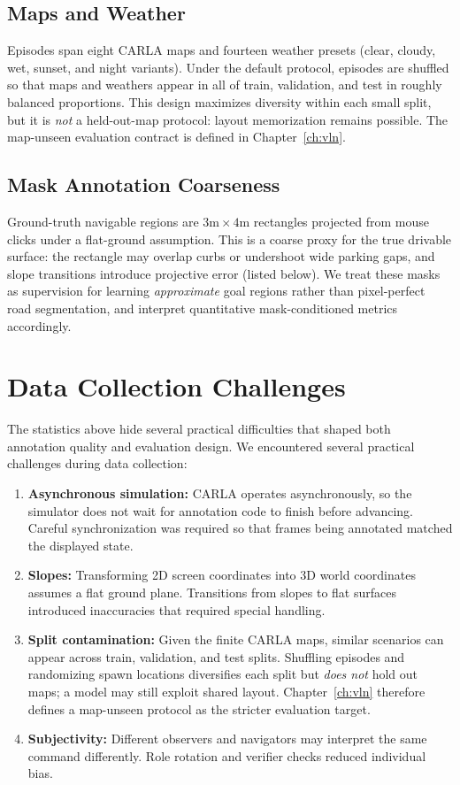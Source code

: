 \subsection{Maps and Weather}

Episodes span eight CARLA maps and fourteen weather presets (clear, cloudy, wet, sunset, and night variants). Under the default protocol, episodes are shuffled so that maps and weathers appear in all of train, validation, and test in roughly balanced proportions. This design maximizes diversity within each small split, but it is \emph{not} a held-out-map protocol: layout memorization remains possible. The map-unseen evaluation contract is defined in Chapter~\ref{ch:vln}.

\subsection{Mask Annotation Coarseness}

Ground-truth navigable regions are $3\mathrm{m}\times 4\mathrm{m}$ rectangles projected from mouse clicks under a flat-ground assumption. This is a coarse proxy for the true drivable surface: the rectangle may overlap curbs or undershoot wide parking gaps, and slope transitions introduce projective error (listed below). We treat these masks as supervision for learning \emph{approximate} goal regions rather than pixel-perfect road segmentation, and interpret quantitative mask-conditioned metrics accordingly.

\section{Data Collection Challenges}

The statistics above hide several practical difficulties that shaped both annotation quality and evaluation design. We encountered several practical challenges during data collection:

\begin{enumerate}
    \item \textbf{Asynchronous simulation:} CARLA operates asynchronously, so the simulator does not wait for annotation code to finish before advancing. Careful synchronization was required so that frames being annotated matched the displayed state.
    \item \textbf{Slopes:} Transforming 2D screen coordinates into 3D world coordinates assumes a flat ground plane. Transitions from slopes to flat surfaces introduced inaccuracies that required special handling.
    \item \textbf{Split contamination:} Given the finite CARLA maps, similar scenarios can appear across train, validation, and test splits. Shuffling episodes and randomizing spawn locations diversifies each split but \emph{does not} hold out maps; a model may still exploit shared layout. Chapter~\ref{ch:vln} therefore defines a map-unseen protocol as the stricter evaluation target.
    \item \textbf{Subjectivity:} Different observers and navigators may interpret the same command differently. Role rotation and verifier checks reduced individual bias.
\end{enumerate}

